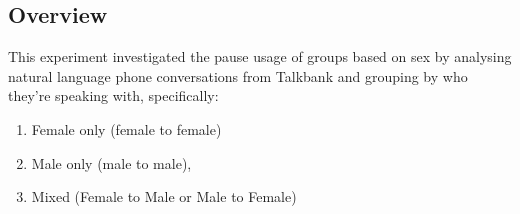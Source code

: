 \subsection{Overview}
This experiment investigated the pause usage of groups based on sex by analysing natural language phone conversations from Talkbank and grouping by who they're speaking with, specifically: 

\begin{enumerate}
\item Female only (female to female) 
\item Male only (male to male),
\item Mixed (Female to Male or Male to Female)
\end{enumerate}


%


